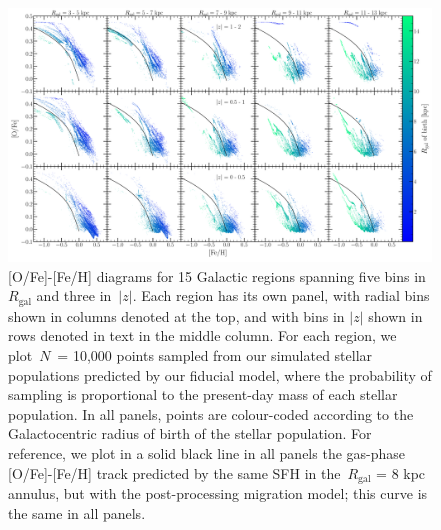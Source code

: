 \documentclass[draft2.tex]{subfiles}
\begin{document}
\begin{figure} 
\centering 
\includegraphics[scale = 0.28]{ofe_feh_densitymap.pdf} 
\caption{[O/Fe]-[Fe/H] diagrams for 15 Galactic regions spanning five bins in 
$R_\text{gal}$ and three in~$\left|z\right|$. Each region has its own panel, 
with radial bins shown in columns denoted at the top, and with bins in 
$\left|z\right|$ shown in rows denoted in text in the middle column. For each 
region, we plot~$N$~= 10,000 points sampled from our simulated stellar 
populations predicted by our fiducial model, where the probability of 
sampling is proportional to the present-day mass of each stellar population. 
In all panels, points are colour-coded according to the Galactocentric radius 
of birth of the stellar population. For reference, we plot in a solid black 
line in all panels the gas-phase [O/Fe]-[Fe/H] track predicted by the same 
SFH in the~$R_\text{gal}$ = 8 kpc annulus, but with the post-processing 
migration model; this curve is the same in all panels. } 
\label{fig:ofe_feh_diagram} 
\end{figure} 
\end{document}
